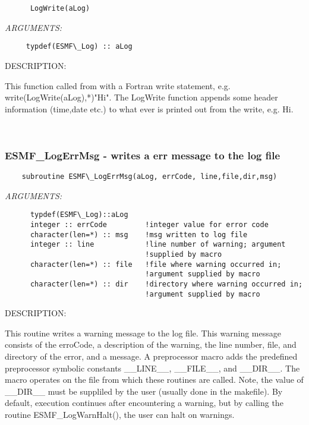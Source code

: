   
\begin{verbatim}      LogWrite(aLog)\end{verbatim}{\em ARGUMENTS:}
\begin{verbatim}     typdef(ESMF\_Log) :: aLog\end{verbatim}
{\sf DESCRIPTION:\\ }


      This function called from with a Fortran write statement, e.g.
      write(LogWrite(aLog),*)"Hi".  The LogWrite function appends some
      header information (time,date etc.) to what ever is printed out
      from the write, e.g. Hi. 
 
\mbox{}\hrulefill\ 
 

  \subsubsection [ESMF\_LogErrMsg] {ESMF\_LogErrMsg - writes a err message to the log file}


  
\begin{verbatim}    subroutine ESMF\_LogErrMsg(aLog, errCode, line,file,dir,msg)\end{verbatim}{\em ARGUMENTS:}
\begin{verbatim}      typdef(ESMF\_Log)::aLog
      integer :: errCode         !integer value for error code
      character(len=*) :: msg    !msg written to log file
      integer :: line            !line number of warning; argument
                                 !supplied by macro
      character(len=*) :: file   !file where warning occurred in;
                                 !argument supplied by macro
      character(len=*) :: dir    !directory where warning occurred in;
                                 !argument supplied by macro\end{verbatim}
{\sf DESCRIPTION:\\ }


      This routine writes a warning message to the log file.  This warning
      message consists of the erroCode, a description of the warning, the
      line number, file, and directory of the error, and a message. A
      preprocessor macro adds the predefined preprocessor symbolic
      constants \_\_LINE\_\_, \_\_FILE\_\_, and \_\_DIR\_\_.
      The macro operates on
      the file from which these routines are called.  Note,
      the value of \_\_DIR\_\_
      must be suppliled by the user (usually done in
      the makefile).  By default, execution continues after encountering
      a warning, but by calling the routine ESMF\_LogWarnHalt(), the user
      can halt on warnings.
   
